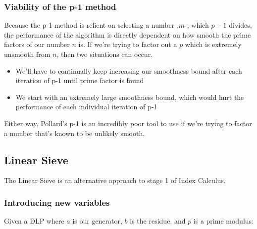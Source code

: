 \documentclass{article}
\begin{document}
        \subsubsection{Viability of the p-1 method}

        Because the p-1 method is relient on selecting a number ,$m$ , which $p-1$ divides, the performance of the algorithm is directly dependent on how smooth the prime factors of our number $n$ is.  If we're trying to factor out a $p$ which is extremely unsmooth from $n$, then two situations can occur.

        \begin{itemize}

          \item We'll have to continually keep increasing our smoothness bound after each iteration of p-1 until prime factor is found

          \item We start with an extremely large smoothness bound, which would hurt the performance of each individual iteration of p-1

        \end{itemize}

        Either way, Pollard's p-1 is an incredibly poor tool to use if we're trying to factor a number that's known to be unlikely smooth.

        \subsection{Linear Sieve}
        The Linear Sieve is an alternative approach to stage 1 of Index Calculus. \autocite{Coppersmith1986} \\

        \subsubsection{Introducing new variables}

        Given a DLP where $a$ is our generator, $b$ is the residue, and $p$ is a prime modulus: \\
\end{document}
